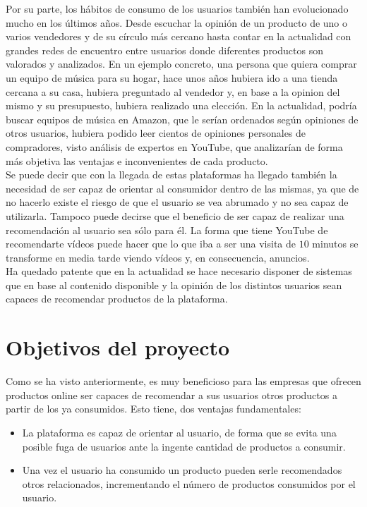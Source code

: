 Por su parte, los hábitos de consumo de los usuarios también han evolucionado mucho en los últimos años. Desde escuchar la opinión de un producto de uno o varios vendedores y de su círculo más cercano hasta contar en la actualidad con grandes redes de encuentro entre usuarios donde diferentes productos son valorados y analizados. En un ejemplo concreto, una persona que quiera comprar un equipo de música para su hogar, hace unos años hubiera ido a una tienda cercana a su casa, hubiera preguntado al vendedor y, en base a la opinion del mismo y su presupuesto, hubiera realizado una elección. En la actualidad, podría buscar equipos de música en Amazon, que le serían ordenados según opiniones de otros usuarios, hubiera podido leer cientos de opiniones personales de compradores, visto análisis de expertos en YouTube, que analizarían de forma más objetiva las ventajas e inconvenientes de cada producto.\\

Se puede decir que con la llegada de estas plataformas ha llegado también la necesidad de ser capaz de orientar al consumidor dentro de las mismas, ya que de no hacerlo existe el riesgo de que el usuario se vea abrumado y no sea capaz de utilizarla. Tampoco puede decirse que el beneficio de ser capaz de realizar una recomendación al usuario sea sólo para él. La forma que tiene YouTube de recomendarte vídeos puede hacer que lo que iba a ser una visita de $10$ minutos se transforme en media tarde viendo vídeos y, en consecuencia, anuncios.\\

Ha quedado patente que en la actualidad se hace necesario disponer de sistemas que en base al contenido disponible y la opinión de los distintos usuarios sean capaces de recomendar productos de la plataforma.


\section{Objetivos del proyecto}\label{sec:objetivos}

Como se ha visto anteriormente, es muy beneficioso para las empresas que ofrecen productos online ser capaces de recomendar a sus usuarios otros productos a partir de los ya consumidos. Esto tiene, dos ventajas fundamentales:

\begin{itemize}
    \item La plataforma es capaz de orientar al usuario, de forma que se evita una posible fuga de usuarios ante la ingente cantidad de productos a consumir.
    
    \item Una vez el usuario ha consumido un producto pueden serle recomendados otros relacionados, incrementando el número de productos consumidos por el usuario.
\end{itemize}

